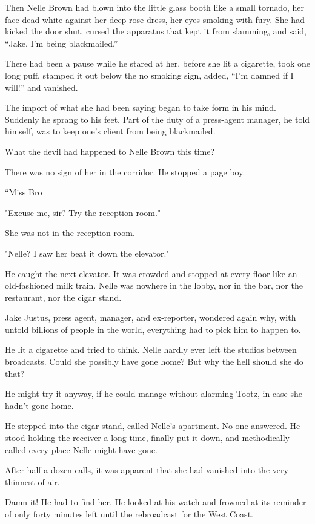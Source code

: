 \documentclass{novel}
\begin{document}
Then Nelle Brown had blown into the little glass booth like a small tornado, her face dead-white against her deep-rose dress, her eyes smoking with fury. She had kicked the door shut, cursed the apparatus that kept it from slamming, and said, “Jake, I’m being blackmailed.”

There had been a pause while he stared at her, before she lit a cigarette, took one long puff, stamped it out below the no smoking sign, added, “I’m damned if I will!” and vanished.

The import of what she had been saying began to take form in his mind. Suddenly he sprang to his feet. Part of the duty of a press-agent manager, he told himself, was to keep one’s client from being blackmailed.

What the devil had happened to Nelle Brown this time?

There was no sign of her in the corridor. He stopped a page boy.

“Miss Bro

"Excuse me, sir? Try the reception room."

She was not in the reception room.

"Nelle? I saw her beat it down the elevator."

He caught the next elevator. It was crowded and stopped at every floor like an old-fashioned milk train. Nelle was nowhere in the lobby, nor in the bar, nor the restaurant, nor the cigar stand.

Jake Justus, press agent, manager, and ex-reporter, wondered again why, with untold billions of people in the world, everything had to pick him to happen to.

He lit a cigarette and tried to think. Nelle hardly ever left the studios between broadcasts. Could she possibly have gone home? But why the hell should she do that?

He might try it anyway, if he could manage without alarming Tootz, in case she hadn't gone home.

He stepped into the cigar stand, called Nelle's apartment. No one answered. He stood holding the receiver a long time, finally put it down, and methodically called every place Nelle might have gone.

After half a dozen calls, it was apparent that she had vanished into the very thinnest of air.

Damn it! He had to find her. He looked at his watch and frowned at its reminder of only forty minutes left until the rebroadcast for the West Coast.
\end{document}
